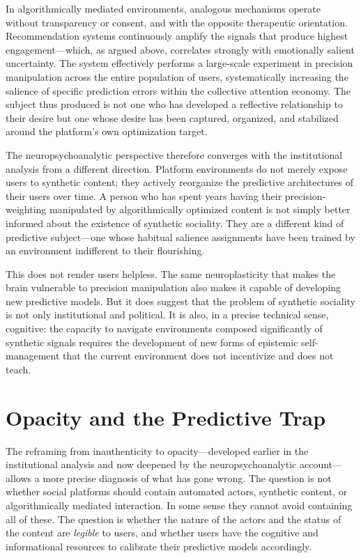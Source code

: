 \documentclass[12pt,a4paper]{article}
\begin{document}
In algorithmically mediated environments, analogous mechanisms operate without transparency
or consent, and with the opposite therapeutic orientation. Recommendation systems continuously
amplify the signals that produce highest engagement---which, as argued above, correlates
strongly with emotionally salient uncertainty. The system effectively performs a large-scale
experiment in precision manipulation across the entire population of users, systematically
increasing the salience of specific prediction errors within the collective attention economy.
The subject thus produced is not one who has developed a reflective relationship to their desire
but one whose desire has been captured, organized, and stabilized around the platform's own
optimization target.

The neuropsychoanalytic perspective therefore converges with the institutional analysis from a
different direction. Platform environments do not merely expose users to synthetic content; they
actively reorganize the predictive architectures of their users over time. A person who has
spent years having their precision-weighting manipulated by algorithmically optimized content
is not simply better informed about the existence of synthetic sociality. They are a different
kind of predictive subject---one whose habitual salience assignments have been trained by an
environment indifferent to their flourishing.

This does not render users helpless. The same neuroplasticity that makes the brain vulnerable
to precision manipulation also makes it capable of developing new predictive models. But it
does suggest that the problem of synthetic sociality is not only institutional and political. It
is also, in a precise technical sense, cognitive: the capacity to navigate environments composed
significantly of synthetic signals requires the development of new forms of epistemic
self-management that the current environment does not incentivize and does not teach.

\section{Opacity and the Predictive Trap}

The reframing from inauthenticity to opacity---developed earlier in the institutional analysis
and now deepened by the neuropsychoanalytic account---allows a more precise diagnosis of what
has gone wrong. The question is not whether social platforms should contain automated actors,
synthetic content, or algorithmically mediated interaction. In some sense they cannot avoid
containing all of these. The question is whether the nature of the actors and the status of the
content are \emph{legible} to users, and whether users have the cognitive and informational
resources to calibrate their predictive models accordingly.
\end{document}
